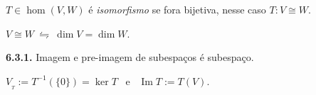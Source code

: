 
\begin{definition}
    \(T\in \hom(V,W)\) é \emph{isomorfismo} se fora bijetiva, nesse caso \(T: V\cong W\).  
\end{definition}


\begin{theorem}
    \(V\cong W \ \leftrightharpoons \ \dim V = \dim W\). 
\end{theorem}

\begin{lemma}
    \textbf{6.3.1.} Imagem e pre-imagem de subespaços é subespaço.  %
\end{lemma}

\begin{definition}
    \centering 
    \(V_{_T} := T^{-1}(\{0\}) = \ker T \) \  e \  \(\operatorname{Im}T := T(V)\). 
\end{definition}

